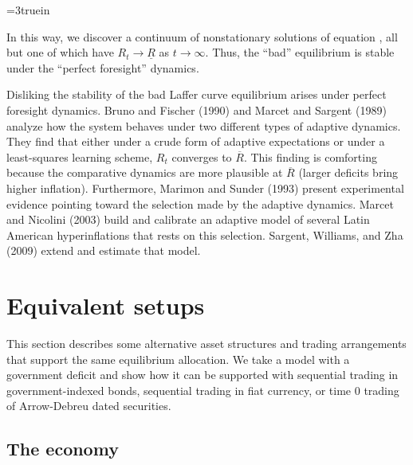 \centerline{\epsfxsize=3truein}
\caption{Equilibria with debt- or money-financed government deficit finance.}
\endfigure

In this way, we discover a continuum of nonstationary solutions
of  equation  , all but one of which  have
$R_t \rightarrow \underline R$ as $t \rightarrow \infty$.  Thus, the
``bad''  equilibrium is stable under the ``perfect foresight'' dynamics.

Disliking the stability of the bad Laffer curve equilibrium arises under
perfect foresight dynamics.
Bruno and Fischer (1990) and Marcet and Sargent (1989) analyze
how the system behaves under two different types of adaptive
dynamics.  They find that either under a crude form
of  adaptive expectations  or under a least-squares learning scheme,
$R_t$ converges to  $\overline R$.   This finding  is comforting because
the comparative dynamics are more plausible at $\overline  R$
(larger deficits bring higher inflation).  Furthermore,
Marimon and Sunder (1993) present experimental evidence
pointing toward the selection  made by the adaptive dynamics.
Marcet and Nicolini  (2003) build and calibrate an adaptive model of several
Latin American hyperinflations that rests on this selection. Sargent, Williams, and Zha (2009)
extend and estimate that model.
%
%






\section{Equivalent setups}\label{sec:MMgov}%
This section describes some alternative asset structures
and trading arrangements that support the
same equilibrium  allocation.   We take a model with
a government deficit and show how it can be supported
with sequential trading in government-indexed bonds,
sequential trading in fiat currency, or time $0$ trading
of Arrow-Debreu dated securities.


\subsection{The economy}

